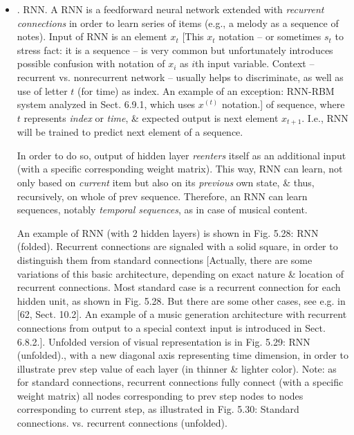 \documentclass{article}
\begin{document}
\begin{itemize}
\begin{itemize}
\begin{itemize}
		\end{itemize}
		\item {. RNN.} A RNN is a feedforward neural network extended with {\it recurrent connections} in order to learn series of items (e.g., a melody as a sequence of notes). Input of RNN is an element $x_t$ [This $x_t$ notation -- or sometimes $s_t$ to stress fact: it is a sequence -- is very common but unfortunately introduces possible confusion with notation of $x_i$ as $i$th input variable. Context -- recurrent vs. nonrecurrent network -- usually helps to discriminate, as well as use of letter $t$ (for time) as index. An example of an exception: RNN-RBM system analyzed in Sect. 6.9.1, which uses $x^{(t)}$ notation.] of sequence, where $t$ represents {\it index} or {\it time}, \& expected output is next element $x_{t+1}$. I.e., RNN will be trained to predict next element of a sequence.
		
		In order to do so, output of hidden layer {\it reenters} itself as an additional input (with a specific corresponding weight matrix). This way, RNN can learn, not only based on {\it current} item but also on its {\it previous} own state, \& thus, recursively, on whole of prev sequence. Therefore, an RNN can learn sequences, notably {\it temporal sequences}, as in case of musical content.
		
		An example of RNN (with 2 hidden layers) is shown in {\sf Fig. 5.28: RNN (folded).} Recurrent connections are signaled with a solid square, in order to distinguish them from standard connections [Actually, there are some variations of this basic architecture, depending on exact nature \& location of recurrent connections. Most standard case is a recurrent connection for each hidden unit, as shown in {\sf Fig. 5.28}. But there are some other cases, see e.g. in [62, Sect. 10.2]. An example of a music generation architecture with recurrent connections from output to a special context input is introduced in Sect. 6.8.2.]. Unfolded version of visual representation is in {\sf Fig. 5.29: RNN (unfolded).}, with a new diagonal axis representing time dimension, in order to illustrate prev step value of each layer (in thinner \& lighter color). Note: as for standard connections, recurrent connections fully connect (with a specific weight matrix) all nodes corresponding to prev step nodes to nodes corresponding to current step, as illustrated in {\sf Fig. 5.30: Standard connections. vs. recurrent connections (unfolded).}
		

\end{itemize}
\end{itemize}
\end{document}
